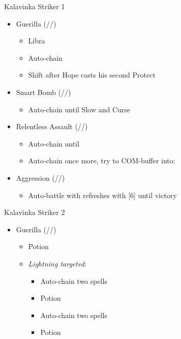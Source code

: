 \begin{multicols}{2}
\renewcommand{\first}{[1] Guerilla (\rav/\syn/\sab)}
\renewcommand{\second}{[2] Smart Bomb (\rav/\rav/\sab)}
\renewcommand{\third}{[3] Mystic Tower}
\renewcommand{\fourth}{[4] Relentless Assault (\rav/\rav/\com)}
\renewcommand{\fifth}{[5] Aggression (\com/\rav/\com)}
\begin{battle}{Kalavinka Striker 1}
\begin{itemize}
    \item \first
    \begin{itemize}
        \item Libra
        \item Auto-chain
        \item Shift after Hope casts his second Protect
    \end{itemize}
    \item \second
    \begin{itemize}
        \item Auto-chain until Slow and Curse
    \end{itemize}
    \item \fourth
    \begin{itemize}
        \item Auto-chain until \stagger
        \item Auto-chain once more, try to COM-buffer into:
    \end{itemize}
    \item \fifth
    \begin{itemize}
        \item Auto-battle with refreshes with [6] until victory
    \end{itemize}
\end{itemize}
\end{battle}
\begin{battle}{Kalavinka Striker 2}
\begin{itemize}
    \item \first
    \begin{itemize}
        \item Potion
        \item \textit{Lightning targeted}:
        \begin{itemize}
            \item Auto-chain two spells
            \item Potion
            \item Auto-chain two spells
            \item Potion
        \end{itemize}

\end{itemize}
\end{itemize}
\end{battle}
\end{multicols}
